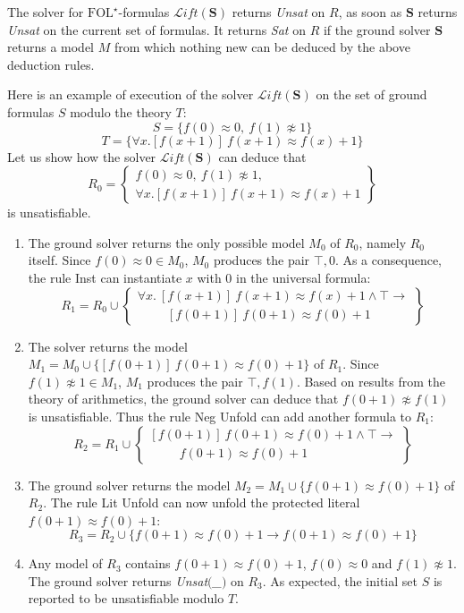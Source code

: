 \documentclass[]{easychair}
\newcommand{\Lift}{{\mathcal{L}\mathit{ift}(\mathbf{S})}}
\newcommand{\GS}{\mathbf{S}}
\newcommand{\FOLT}{\mathrm{FOL}^\star}
\begin{document}
The solver for $\FOLT$-formulas $\Lift$ returns \emph{Unsat} on $R$, as
soon as $\GS$ returns \emph{Unsat} on the current set of formulas.
It returns \emph{Sat} on $R$ if the ground solver $\GS$ returns a model $M$
from which nothing new can be deduced by the above deduction rules.

Here is an example of execution of the solver $\Lift$ on the set of ground
formulas $S$ modulo the theory $T$:
\[S =\{f(0)\approx 0,\ f(1)\not\approx 1\}\]
\[T =\{\forall x.[f(x+1)]~f(x+1)\approx f(x)+1\}\]
Let us show how the solver $\Lift$ can deduce that
\[R_0 = \left\{\begin{array}{l}
               f(0)\approx 0,\ f(1)\not\approx 1,\\
               \boxed{\forall x.[f(x+1)]~f(x+1)\approx f(x)+1}
              \end{array}\right\}
\]
is unsatisfiable.
\begin{enumerate}
 \item The ground solver returns the only possible model $M_0$ of $R_0$, namely
$R_0$ itself. Since $f(0)\approx 0\in M_0$, $M_0$ produces the pair $\top,0$. As
a consequence, the rule {\sc Inst} can instantiate $x$ with $0$ in the universal
formula:
\[R_1 = R_0\cup\left\{\begin{array}{l}
\boxed{\forall
x.~[f(x+1)]~f(x+1)\approx f(x)+1}\wedge\top\to {}\\
\hspace{1cm}\boxed{[f(0+1)]~f(0+1)\approx f(0)+1}
\end{array}\right\}\]
 \item The solver returns the model $M_1 =
M_0\cup\{\boxed{[f(0+1)]~f(0+1)\approx f(0)+1}\}$ of $R_1$. Since
$f(1)\not\approx 1\in M_1$, $M_1$ produces the pair $\top,f(1)$.
Based on results from the
theory of arithmetics, the ground solver can
deduce that $f(0+1)\not\approx f(1)$ is unsatisfiable. Thus the rule
{\sc Neg Unfold} can add another formula to $R_1$:
\[R_2 = R_1\cup\left\{\begin{array}{l}
\boxed{[f(0+1)]~f(0+1)\approx f(0)+1}\wedge\top\to {}\\
\hspace{1cm}\boxed{f(0+1)\approx f(0)+1}
\end{array}\right\}\]
 \item The ground solver returns the model
$M_2 =M_1\cup\{\boxed{f(0+1)\approx f(0)+1}\}$ of $R_2$. The rule {\sc
Lit Unfold} can
now unfold the protected literal $\boxed{f(0+1)\approx f(0)+1}$:
\[R_3 = R_2\cup\{\boxed{f(0+1)\approx f(0)+1}\to f(0+1)\approx f(0)+1
\}\]
 \item Any model of
$R_3$ contains $f(0+1)\approx f(0)+1$, $f(0)\approx 0$ and $f(1)\not\approx 1$.
The ground solver
returns \emph{Unsat$($\_$)$} on $R_3$. As expected, the initial set $S$ is
reported to be unsatisfiable modulo $T$.
\end{enumerate}
\end{document}
